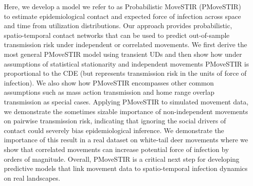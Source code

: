 \documentclass[letterpaper]{article}
\begin{document}

Here, we develop a model we refer to as Probabilistic MoveSTIR (PMoveSTIR) to estimate epidemiological contact and expected force of infection across space and time from utilization distributions. 
Our approach provides probabilistic, spatio-temporal contact networks that can be used to predict out-of-sample transmission risk under independent or correlated movements. We first derive the most general PMoveSTIR model using transient UDs and then show how under assumptions of statistical stationarity and independent movements PMoveSTIR is proportional to the CDE (but represents transmission risk in the units of force of infection). We also show how PMoveSTIR encompasses other common assumptions such as mass action transmission and home range overlap transmission as special cases. Applying PMoveSTIR to simulated movement data, we demonstrate the sometimes sizable importance of non-independent movements on pairwise transmission risk, indicating that ignoring the social drivers of contact could severely bias epidemiological inference.  We demonstrate the importance of this result in a real dataset on white-tail deer movements where we show that correlated movements can increase potential force of infection by orders of magnitude.  Overall, PMoveSTIR is a critical next step for developing predictive models that link movement data to spatio-temporal infection dynamics on real landscapes.
\end{document}
